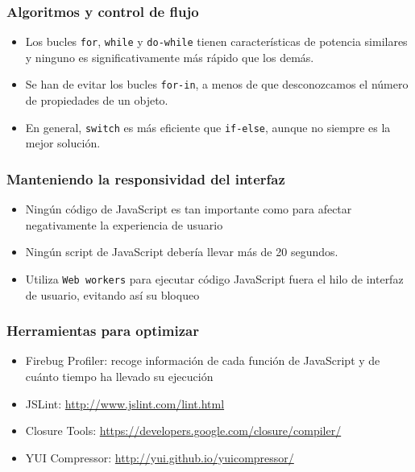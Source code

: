 \begin{frame}
\frametitle{Algoritmos y control de flujo}

\begin{itemize}
  \item Los bucles \texttt{for}, \texttt{while} y \texttt{do-while} tienen características de potencia similares y ninguno es significativamente más rápido que los demás.
  \item Se han de evitar los bucles \texttt{for-in}, a menos de que desconozcamos el número de propiedades de un objeto.
  \item En general, \texttt{switch} es más eficiente que \texttt{if-else}, aunque no siempre es la mejor solución.
\end{itemize}

\end{frame}





\begin{frame}
\frametitle{Manteniendo la responsividad del interfaz}

\begin{itemize}
  \item Ningún código de JavaScript es tan importante como para afectar negativamente la experiencia de usuario
  \item Ningún script de JavaScript debería llevar más de 20 segundos.
  \item Utiliza \texttt{Web workers} para ejecutar código JavaScript fuera el hilo de interfaz de usuario, evitando así su bloqueo
\end{itemize}

\end{frame}



\begin{frame}
\frametitle{Herramientas para optimizar}

\begin{itemize}
  \item Firebug Profiler: recoge información de cada función de JavaScript y de cuánto tiempo ha llevado su ejecución
  \item JSLint: \url{http://www.jslint.com/lint.html}
  \item Closure Tools: \url{https://developers.google.com/closure/compiler/}
  \item YUI Compressor: \url{http://yui.github.io/yuicompressor/}
\end{itemize}

\end{frame}


